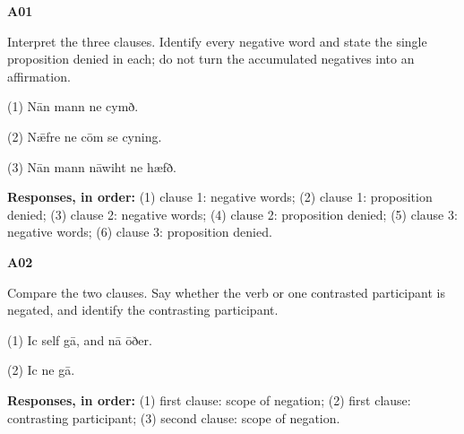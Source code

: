 \par\begin{minipage}{\linewidth}\raggedright
\textbf{A01}

Interpret the three clauses. Identify every negative word and state the single proposition denied in each; do not turn the accumulated negatives into an affirmation.

(1) Nān mann ne cymð.

(2) Nǣfre ne cōm se cyning.

(3) Nān mann nāwiht ne hæfð.

\textbf{Responses, in order:} (1) clause 1: negative words; (2) clause 1: proposition denied; (3) clause 2: negative words; (4) clause 2: proposition denied; (5) clause 3: negative words; (6) clause 3: proposition denied.

\end{minipage}\par\addvspace{4pt}

\par\begin{minipage}{\linewidth}\raggedright
\textbf{A02}

Compare the two clauses. Say whether the verb or one contrasted participant is negated, and identify the contrasting participant.

(1) Ic self gā, and nā ōðer.

(2) Ic ne gā.

\textbf{Responses, in order:} (1) first clause: scope of negation; (2) first clause: contrasting participant; (3) second clause: scope of negation.

\end{minipage}\par\addvspace{4pt}

